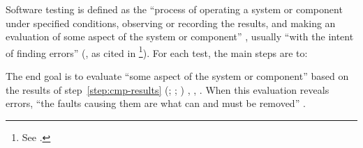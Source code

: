 Software testing is defined as the ``process of operating a system or component
under specified conditions, observing or recording the results, and making an
evaluation of some aspect of the system or component'' \citep{ISO_IEC2014}%
\ifnotpaper, usually ``with the intent of finding errors''
(\citealp{Myers1976}, as cited in \citealp[p.~438]{PetersAndPedrycz2000}%
\footnote{See .})\fi.
For each test, the main steps are to:
The end goal is to evaluate ``some aspect of the system or component'' based on
the results of step~\ref{step:cmp-results} \ifnotpaper (\citealp[p.~10]{IEEE2022};
    \citeyear[p.~6]{IEEE2021c}; \citealp{ISO_IEC2014})\else
    \cite[p.~10]{IEEE2022}, \cite[p.~6]{IEEE2021c}, \cite{ISO_IEC2014}\fi.
When this evaluation reveals errors, ``the faults causing them are what can and
must be removed'' \citep[p.~5\=/3]{SWEBOK2024}.

